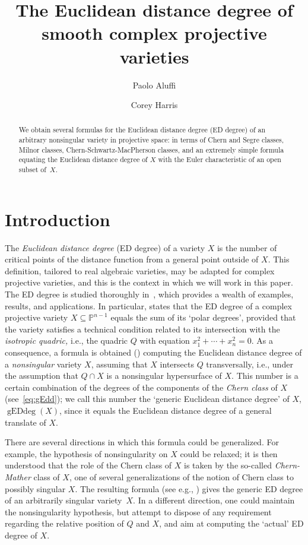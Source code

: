 \documentclass[11pt]{amsart}
\title{The Euclidean distance degree of smooth complex projective varieties}
\author{Paolo Aluffi}
\author{Corey Harris}
\numberwithin{equation}{section}
\newcommand{\Pbb}{{\mathbb{P}}}
\DeclareMathOperator{\gEdd}{gEDdeg}
\begin{document}
\begin{abstract}
We obtain several formulas for the Euclidean distance degree (ED degree) of an
arbitrary nonsingular variety in projective space: in terms of Chern and Segre classes, 
Milnor classes, Chern-Schwartz-MacPherson classes, and an extremely simple 
formula equating the Euclidean distance degree of $X$ with the Euler 
characteristic of an open subset of~$X$.
\end{abstract}

\maketitle


\section{Introduction}\label{intro}

The {\em Euclidean distance degree\/} (ED degree) of a variety $X$ is the
number of critical points of the distance function from a general
point outside of $X$. This definition, tailored to real algebraic varieties,
may be adapted for complex projective varieties, and this is the context
in which we will work in this paper. The ED degree is studied thoroughly 
in~\cite{MR3451425}, which provides a wealth of examples, results, and 
applications. In particular, \cite[Theorem~5.4]{MR3451425} states that the 
ED degree of a complex projective variety $X\subseteq\Pbb^{n-1}$ equals 
the sum of its `polar degrees', provided that the variety satisfies a technical 
condition related to its intersection with the {\em isotropic quadric,\/} i.e., 
the quadric $Q$ with equation $x_1^2+\cdots +x_n^2=0$. 
As a consequence, a formula is obtained (\cite[Theorem~5.8]{MR3451425}) 
computing the Euclidean distance degree of a {\em nonsingular\/} variety 
$X$, assuming that $X$ intersects $Q$ transversally, i.e., under the assumption 
that $Q\cap X$ is a nonsingular hypersurface of $X$.
This number is a certain combination of the degrees of the components of the 
{\em Chern class\/} of $X$ (see~\eqref{eq:gEdd}); we call this number the 
`generic Euclidean distance degree' of $X$, $\gEdd(X)$, since it equals the 
Euclidean distance degree of a general translate of $X$.

There are several directions in which this formula could be generalized.
For example, the hypothesis of nonsingularity on $X$ could be relaxed; it is then
understood that the role of the Chern class of $X$ is taken by the so-called
{\em Chern-Mather\/} class of $X$, one of several generalizations of the notion
of Chern class to possibly singular $X$. The resulting formula (see e.g., 
\cite[Proposition~2.9]{produa}) gives the generic ED degree of an arbitrarily 
singular variety~$X$. In a different direction, one
could maintain the nonsingularity hypothesis, but attempt to dispose of any
requirement regarding the relative position of $Q$ and $X$, and aim at
computing the `actual' ED degree of $X$.
\end{document}
